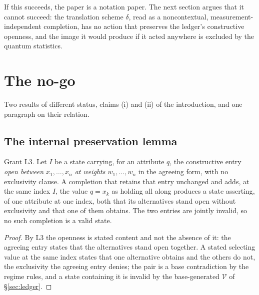 If this succeeds, the paper is a notation paper. The next section argues that it cannot succeed: the translation scheme $\delta$, read as a noncontextual, measurement-independent completion, has no action that preserves the ledger's constructive openness, and the image it would produce if it acted anywhere is excluded by the quantum statistics.

\section{The no-go}\label{sec:nogo}

Two results of different status, claims (i) and (ii) of the introduction, and one paragraph on their relation.

\subsection{The internal preservation lemma}\label{sec:transit}

\begin{lemma}\label{lem:preservation}
Grant L3. Let $I$ be a state carrying, for an attribute $q$, the constructive entry \emph{open between $x_1, \dots, x_n$ at weights $w_1, \dots, w_n$} in the agreeing form, with no exclusivity clause. A completion that retains that entry unchanged and adds, at the same index $I$, the value $q = x_k$ as holding all along produces a state asserting, of one attribute at one index, both that its alternatives stand open without exclusivity and that one of them obtains. The two entries are jointly invalid, so no such completion is a valid state.
\end{lemma}
\begin{proof}
By L3 the openness is stated content and not the absence of it: the agreeing entry states that the alternatives stand open together. A stated selecting value at the same index states that one alternative obtains and the others do not, the exclusivity the agreeing entry denies; the pair is a base contradiction by the regime rules, and a state containing it is invalid by the base-generated $\mathcal{V}$ of \S\ref{sec:ledger}.
\end{proof}

